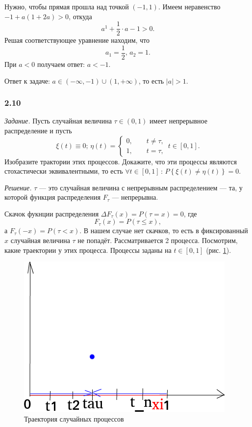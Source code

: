 Нужно, чтобы прямая прошла над точкой $ \left( -1, 1 \right) $.
Имеем неравенство $-1 + a \left( 1 + 2a \right) > 0$, откуда
$$a^1 + \frac{1}{2} \cdot a - 1 >
  0.$$
Решая соответствующее уравнение находим, что
$$a_1 = \frac{1}{2}, \,
  a_2 = 1.$$
При $a < 0$ получаем ответ: $a < -1$.

Ответ к задаче: $a \in \left( - \infty, -1 \right) \cup \left( 1, + \infty \right) $,
то есть $ \left| a \right| > 1$.

\subsubsection*{2.10}

\textit{Задание.}
Пусть случайная величина $ \tau \in \left( 0, 1 \right) $ имеет непрерывное распределение и пусть
$$ \xi \left( t \right) \equiv 0; \,
  \eta \left( t \right) =
  \begin{cases}
    0, \qquad t \neq \tau, \\
    1, \qquad t = \tau,
  \end{cases} \,
  t \in \left[ 0, 1 \right].$$
Изобразите трактории этих процессов.
Докажите, что эти процессы являются стохастически эквивалентными, то есть
$ \forall t \in \left[ 0, 1 \right] \, : \,
  P \left\{ \xi \left( t \right) \neq \eta \left( t \right) \right\} = 0$.

\textit{Решение.}
$ \tau $ --- это случайная величина с непрерывным распределением --- та,
у которой функция распределения $F_{ \tau }$ --- непрерывна.

Скачок фукнции распределения $ \Delta F_{ \tau } \left( x \right) = P \left( \tau = x \right) = 0$,
где
$$F_{ \tau } \left( x \right) = P \left( \tau \leq x \right),$$
а $F_{ \tau } \left( -x \right) = P \left( \tau < x \right) $.
В нашем случае нет скачков, то есть в фиксированный $x$ случайная величина $ \tau $ не попадёт.
Рассматривается 2 процесса.
Посмотрим, какие траектории у этих процесса.
Процессы заданы на $t \in \left[ 0, 1 \right] $ (рис. \ref{fig:210}).

\begin{figure}[h!]
 \centering
 \includegraphics[width=.5\textwidth]{./pictures/2_10.png}
 \caption{Траектория случайных процессов}
 \label{fig:210}
\end{figure}

